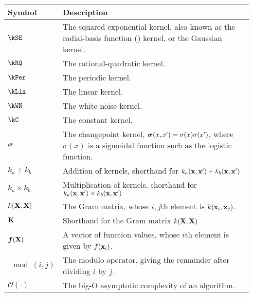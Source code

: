 \begin{tabular}{lm{12cm}}
Symbol \quad     & Description \\
\hline
$\kSE$ & The squared-exponential kernel, also known as the radial-basis function (\RBF{}) kernel, or the Gaussian kernel. \\
$\kRQ$ & The rational-quadratic kernel. \\
$\kPer$ & The periodic kernel. \\
$\kLin$ & The linear kernel. \\
$\kWN$ & The white-noise kernel. \\
$\kC$ & The constant kernel. \\
${\boldsymbol{\sigma}}$ & The changepoint kernel, ${\boldsymbol{\sigma}}(x, x') = \sigma(x) \sigma(x')$, where $\sigma(x)$ is a sigmoidal function such as the logistic function. \\
$k_a + k_b$ & Addition of kernels, shorthand for $k_a({\bf{x}}, {\bf{x}}') + k_b({\bf{x}}, {\bf{x}}')$ \\
$k_a \times k_b$& Multiplication of kernels, shorthand for $k_a({\bf{x}}, {\bf{x}}') \times k_b({\bf{x}}, {\bf{x}}')$ \\
$k(\mathbf{X}, \mathbf{X})$ & The Gram matrix, whose $i,j$th element is $k({\bf{x}}_i, {\bf{x}}_j)$. \\
$\mathbf{K}$ & Shorthand for the Gram matrix $k(\mathbf{X}, \mathbf{X})$ \\
$\boldsymbol{f}(\mathbf{X})$ & A vector of function values, whose $i$th element is given by $f({\bf{x}}_i)$. \\
$\mod(i,j)$ & The modulo operator, giving the remainder after dividing $i$ by $j$. \\
$\mathcal{O}(\cdot)$ & The big-O asymptotic complexity of an algorithm.
\end{tabular}



\outbpdocument{
}


